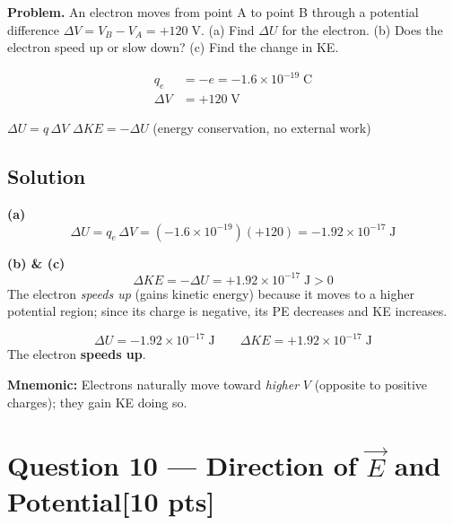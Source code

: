 \documentclass[12pt,letterpaper]{article}
\newcommand{\units}[1]{\;\text{#1}}
\newcommand{\pts}[1]{\hfill\textcolor{TorontoBlue60}{[#1 pts]}}
\begin{document}
\textbf{Problem.} An electron moves from point A to point B through a potential
difference $\Delta V = V_B - V_A = +120\units{V}$.
(a) Find $\Delta U$ for the electron.
(b) Does the electron speed up or slow down?
(c) Find the change in KE.

\begin{tcolorbox}[givenbox]
\begin{align*}
  q_e &= -e = -1.6\times10^{-19}\units{C} \\
  \Delta V &= +120\units{V}
\end{align*}
\end{tcolorbox}

\begin{tcolorbox}[principbox]
$\Delta U = q\,\Delta V$\qquad
$\Delta KE = -\Delta U$ (energy conservation, no external work)
\end{tcolorbox}

\subsection*{Solution}

\textbf{(a)}
\[
  \Delta U = q_e\,\Delta V = (-1.6\times10^{-19})(+120) = -1.92\times10^{-17}\units{J}
\]

\textbf{(b) \& (c)}
\[
  \Delta KE = -\Delta U = +1.92\times10^{-17}\units{J} > 0
\]
The electron \emph{speeds up} (gains kinetic energy) because it moves to a higher potential
region; since its charge is negative, its PE decreases and KE increases.

\begin{tcolorbox}[answerbox]
\[
  \Delta U = -1.92\times10^{-17}\units{J} \qquad
  \Delta KE = +1.92\times10^{-17}\units{J}
\]
The electron \textbf{speeds up}.
\end{tcolorbox}

\begin{tcolorbox}[checkbox]
\textbf{Mnemonic:} Electrons naturally move toward \emph{higher} $V$ (opposite to positive
charges); they gain KE doing so. \checkmark
\end{tcolorbox}

\newpage

\section{Question 10 --- Direction of $\vec{E}$ and Potential\pts{10}}
\label{sec:q10}
\end{document}
